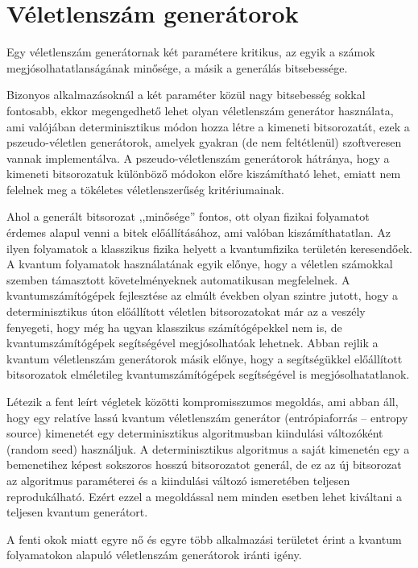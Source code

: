 \documentclass[12pt,a4paper,oneside]{article}
\begin{document}
\section*{Véletlenszám generátorok}
Egy véletlenszám generátornak két paramétere kritikus, az egyik a számok megjósolhatatlanságának minősége, a másik a generálás bitsebessége.
\par
Bizonyos alkalmazásoknál a két paraméter közül nagy bitsebesség sokkal fontosabb, ekkor megengedhető lehet olyan véletlenszám generátor használata, ami valójában determinisztikus módon hozza létre a kimeneti bitsorozatát, ezek a pszeudo-véletlen generátorok, amelyek gyakran (de nem feltétlenül) szoftveresen vannak implementálva. A pszeudo-véletlenszám generátorok hátránya, hogy a kimeneti bitsorozatuk különböző módokon előre kiszámítható lehet, emiatt nem felelnek meg a tökéletes véletlenszerűség kritériumainak.
\par
Ahol a generált bitsorozat ,,minősége'' fontos, ott olyan fizikai folyamatot érdemes alapul venni a bitek előállításához, ami valóban kiszámíthatatlan. Az ilyen folyamatok a klasszikus fizika helyett a kvantumfizika területén keresendőek. A kvantum folyamatok használatának egyik előnye, hogy a véletlen számokkal szemben támasztott követelményeknek automatikusan megfelelnek. A kvantumszámítógépek fejlesztése az elmúlt években olyan szintre jutott, hogy a determinisztikus úton előállított véletlen bitsorozatokat már az a veszély fenyegeti, hogy még ha ugyan klasszikus számítógépekkel nem is, de kvantumszámítógépek segítségével megjósolhatóak lehetnek. Abban rejlik a kvantum véletlenszám generátorok másik előnye, hogy a segítségükkel előállított bitsorozatok elméletileg kvantumszámítógépek segítségével is megjósolhatatlanok.
\par
Létezik a fent leírt végletek közötti kompromisszumos megoldás, ami abban áll, hogy egy relatíve lassú kvantum véletlenszám generátor (entrópiaforrás -- entropy source) kimenetét egy determinisztikus algoritmusban kiindulási változóként (random seed) használjuk. A determinisztikus algoritmus a saját kimenetén egy a bemenetihez képest sokszoros hosszú bitsorozatot generál, de ez az új bitsorozat az algoritmus paraméterei és a kiindulási változó ismeretében teljesen reprodukálható. Ezért ezzel a megoldással nem minden esetben lehet kiváltani a teljesen kvantum generátort.
\par
A fenti okok miatt egyre nő és egyre több alkalmazási területet érint a kvantum folyamatokon alapuló véletlenszám generátorok iránti igény.
\end{document}

